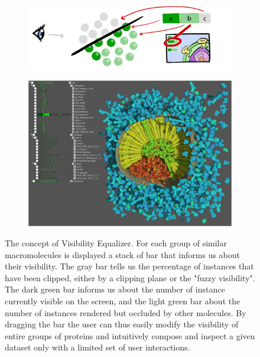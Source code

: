 \begin{figure}
	\centering
	\begin{subfigure}{.5\textwidth}
		\centering
		\includegraphics[width=.99\linewidth]{"graphics/visibility equalizer3"}
		\caption{}
		\label{fig:sub1}
	\end{subfigure}%
	\begin{subfigure}{.5\textwidth}
		\centering
		\includegraphics[width=.99\linewidth]{"graphics/visibility equalizer2"}
		\caption{}
		\label{fig:sub2}
	\end{subfigure}
	\caption{The concept of Visibility Equalizer. For each group of similar macromolecules is displayed a stack of bar that informs us about their visibility. 
		The gray bar tells us the percentage of instances that have been clipped, either by a clipping plane or the "fuzzy visibility". The dark green bar informs us about the number of instance currently visible on the screen, and the light green bar about the number of instances rendered but occluded by other molecules. By dragging the bar the user can thus easily modify the visibility of entire groups of proteins and intuitively compose and inspect a given dataset only with a limited set of user interactions.}
	\label{fig:test1}
\end{figure}

